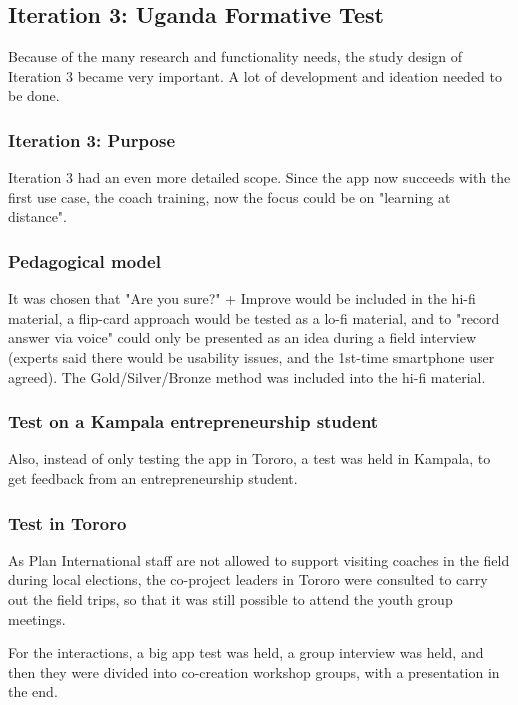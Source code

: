 \subsection{Iteration 3: Uganda Formative Test}

Because of the many research and functionality needs, the study design of Iteration 3 became very important. A lot of development and ideation needed to be done.

\subsubsection{Iteration 3: Purpose}
Iteration 3 had an even more detailed scope. Since the app now succeeds with the first use case, the coach training, now the focus could be on "learning at distance".

\subsubsection{Pedagogical model}
It was chosen that "Are you sure?" + Improve would be included in the hi-fi material, a flip-card approach would be tested as a lo-fi material, and to "record answer via voice" could only be presented as an idea during a field interview (experts said there would be usability issues, and the 1st-time smartphone user agreed). The Gold/Silver/Bronze method was included into the hi-fi material.

\subsubsection{Test on a Kampala entrepreneurship student}
Also, instead of only testing the app in Tororo, a test was held in Kampala, to get feedback from an entrepreneurship student.

\subsubsection{Test in Tororo}
As Plan International staff are not allowed to support visiting coaches in the field during local elections, the co-project leaders in Tororo were consulted to carry out the field trips, so that it was still possible to attend the youth group meetings.

For the interactions, a big app test was held, a group interview was held, and then they were divided into co-creation workshop groups, with a presentation in the end.


